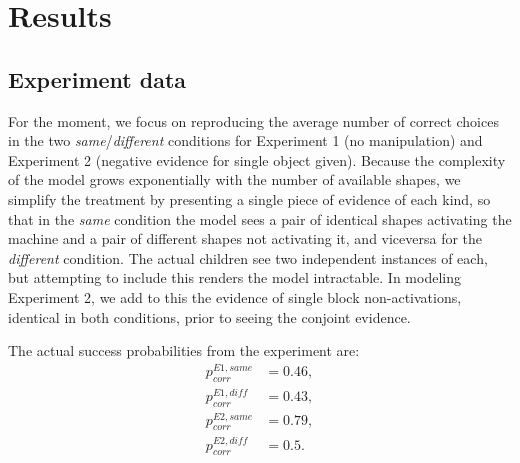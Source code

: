\documentclass[11pt, a4paper]{article}
\begin{document}
 
\section*{Results}
\subsection*{Experiment data}
For the moment, we focus on reproducing the average number of correct choices in the two \emph{same}/\emph{different} conditions for Experiment 1 (no manipulation) and Experiment 2 (negative evidence for single object given). Because the complexity of the model grows exponentially with the number of available shapes, we simplify the treatment by presenting a single piece of evidence of each kind, so that in the \emph{same} condition the model sees a pair of identical shapes activating the machine and a pair of different shapes not activating it, and viceversa for the \emph{different} condition. The actual children see two independent instances of each, but attempting to include this renders the model intractable. In modeling Experiment 2, we add to this the evidence of single block non-activations, identical in both conditions, prior to seeing the conjoint evidence.
 
The actual success probabilities from the experiment are:
\begin{equation}
\begin{split}
p^{E1,same}_{corr}&=0.46,\\
p^{E1,diff}_{corr}&=0.43,\\
p^{E2,same}_{corr}&=0.79,\\
p^{E2,diff}_{corr}&=0.5.
\end{split}
\end{equation}
 
 
\end{document}
